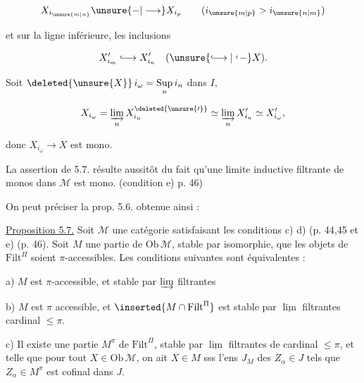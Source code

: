 \[
X_{i_{\unsure{m|n}}}\unsure{-|\longrightarrow} X_{i_p}\qquad(i_{\unsure{m|p}}>i_{\unsure{n|m}})
\]

et sur la ligne inférieure, les inclusions

\[
 X'_{i_m}\lhook\joinrel\longrightarrow X'_{i_n}\quad(\unsure{\lhook\joinrel\longrightarrow|\lhook\joinrel-} X).
\]

Soit $\deleted{\unsure{X}}\,i_\omega=\underset{n}{\mathrm{Sup}}\,i_n$ dans $I$, 

\[
 X_{i_\omega}=\varinjlim_n X^{\deleted{\unsure{\prime}}}_{i_n}\simeq\varinjlim_n X'_{i_n}\simeq X'_{i_\omega},
\]

donc $X_{i_\omega}\longrightarrow X$ est mono.


La  assertion de 5.7. résulte aussitôt du fait qu'une limite inductive filtrante de monos dans $\mathcal M$ est mono. (condition e) p. 46)

On peut préciser la prop. 5.6. obtenue ainsi :

\uline{Proposition 5.7.}  Soit $\mathcal M$ une catégorie satisfaisant les conditions  c) d) (p. 44,45\unsure{,|-} et e) (p. 46). Soit $M$ une partie de $\mathrm{Ob}\,\mathcal M$, stable par isomorphie,   que les objets de $\mathrm{Filt}^{\Pi}$ soient $\pi$-accessibles. Les conditions suivantes sont équivalentes :

a) $M$ est $\pi$-accessible, et stable par $\varinjlim$ filtrantes

b) $M$ est $\pi$ accessible, et $\inserted{M\cap\mathrm{Filt}^{\Pi}}$  est stable par $\underline{\lim}$ filtrantes  cardinal $\leq\pi$.


c) Il existe une partie $M^\pi$ de $\mathrm{Filt}^{\Pi}$, stable par $\underline{\lim}$ filtrantes de cardinal $\leq\pi$,  et telle que pour tout $X\in\mathrm{Ob}\,\mathcal M$,  on ait  $X\in M$ sss l'ens $J_M$ des $Z_\alpha\in J$ tels que $Z_\alpha\in M^\pi$  est cofinal dans $J$.

